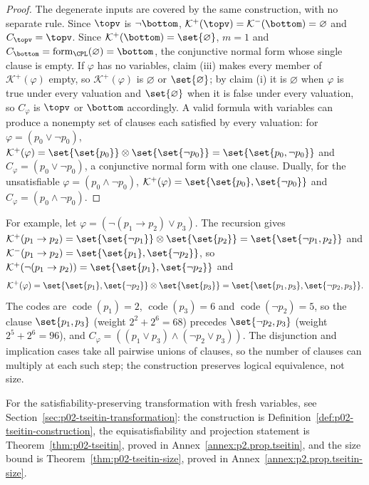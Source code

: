 \begin{proof}
The degenerate inputs are covered by the same construction, with no
separate rule.  Since \(\topv\) is \(\neg\bottom\),
\(\mathcal K^{+}(\topv)=\mathcal K^{-}(\bottom)=\varnothing\) and
\(C_{\topv}=\topv\).  Since \(\mathcal K^{+}(\bottom)=\set{\varnothing}\),
\(m=1\) and
\(C_{\bottom}=\operatorname{form}_{\CPL}(\varnothing)=\bottom\), the
conjunctive normal form whose single clause is empty.  If \(\varphi\) has
no variables, claim (iii) makes every member of \(\mathcal K^{+}(\varphi)\)
empty, so \(\mathcal K^{+}(\varphi)\) is \(\varnothing\) or
\(\set{\varnothing}\); by claim (i) it is \(\varnothing\) when \(\varphi\)
is true under every valuation and \(\set{\varnothing}\) when it is false
under every valuation, so \(C_\varphi\) is \(\topv\) or \(\bottom\)
accordingly.  A valid formula with variables can produce a nonempty set of
clauses each satisfied by every valuation: for \(\varphi=(p_0\lor\neg p_0)\),
\(\mathcal K^{+}(\varphi)=\set{\set{p_0}}\otimes\set{\set{\neg p_0}}
=\set{\set{p_0,\neg p_0}}\) and \(C_\varphi=(p_0\lor\neg p_0)\), a
conjunctive normal form with one clause.  Dually, for the unsatisfiable
\(\varphi=(p_0\land\neg p_0)\), \(\mathcal K^{+}(\varphi)=\set{\set{p_0},\set{\neg p_0}}\)
and \(C_\varphi=(p_0\land\neg p_0)\).
\end{proof}

For example, let \(\varphi=(\neg(p_1\to p_2)\lor p_3)\).  The recursion
gives \(\mathcal K^{+}(p_1\to p_2)=\set{\set{\neg p_1}}\otimes\set{\set{p_2}}
=\set{\set{\neg p_1,p_2}}\) and
\(\mathcal K^{-}(p_1\to p_2)=\set{\set{p_1},\set{\neg p_2}}\), so
\(\mathcal K^{+}(\neg(p_1\to p_2))=\set{\set{p_1},\set{\neg p_2}}\) and
\[
 \mathcal K^{+}(\varphi)
 =\set{\set{p_1},\set{\neg p_2}}\otimes\set{\set{p_3}}
 =\set{\set{p_1,p_3},\set{\neg p_2,p_3}}.
\]
The codes are \(\operatorname{code}(p_1)=2\), \(\operatorname{code}(p_3)=6\)
and \(\operatorname{code}(\neg p_2)=5\), so the clause \(\set{p_1,p_3}\)
(weight \(2^2+2^6=68\)) precedes \(\set{\neg p_2,p_3}\) (weight
\(2^5+2^6=96\)), and
\(C_\varphi=((p_1\lor p_3)\land(\neg p_2\lor p_3))\).  The disjunction and
implication cases take all pairwise unions of clauses, so the number of
clauses can multiply at each such step; the construction preserves logical
equivalence, not size.

For the satisfiability-preserving transformation with fresh variables,
see Section~\ref{sec:p02-tseitin-transformation}: the construction is
Definition~\ref{def:p02-tseitin-construction}, the equisatisfiability and
projection statement is Theorem~\ref{thm:p02-tseitin}, proved in
Annex~\ref{annex:p2.prop.tseitin}, and the size bound is
Theorem~\ref{thm:p02-tseitin-size}, proved in
Annex~\ref{annex:p2.prop.tseitin-size}.

